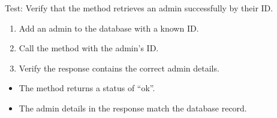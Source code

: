 \documentclass[letterpaper,10pt,english]{sphinxmanual}
\begin{document}
\begin{fulllineitems}
\label{\detokenize{test:test.test_admin.test_get_admin_by_id_success}}
\pysigstartsignatures
\pysiglinewithargsret
{}
{}
{}
\pysigstopsignatures
\sphinxAtStartPar
Test: Verify that the method retrieves an admin successfully by their ID.
\begin{description}
\begin{enumerate}
%
\item {} 
\sphinxAtStartPar
Add an admin to the database with a known ID.

\item {} 
\sphinxAtStartPar
Call the  method with the admin’s ID.

\item {} 
\sphinxAtStartPar
Verify the response contains the correct admin details.

\end{enumerate}

\begin{itemize}
\item {} 
\sphinxAtStartPar
The method returns a status of “ok”.

\item {} 
\sphinxAtStartPar
The admin details in the response match the database record.

\end{itemize}

\end{description}

\end{fulllineitems}

\end{document}
